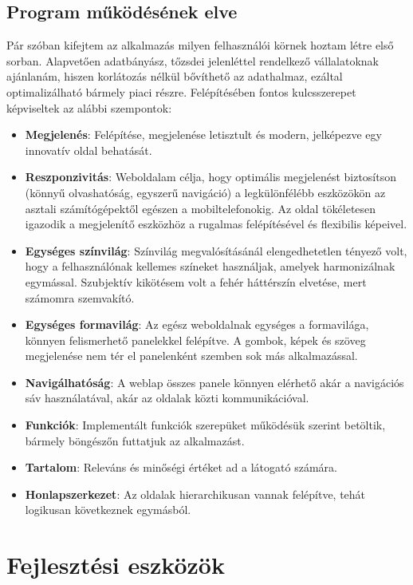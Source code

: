 \subsection{Program működésének elve}

Pár szóban kifejtem az alkalmazás milyen felhasználói körnek hoztam létre első sorban. Alapvetően adatbányász, tőzsdei jelenléttel rendelkező vállalatoknak ajánlanám, hiszen korlátozás nélkül bővíthető az adathalmaz, ezáltal optimalizálható bármely piaci részre. Felépítésében fontos kulcsszerepet képviseltek az alábbi szempontok:

\begin{itemize}
\item \textbf{Megjelenés}: Felépítése, megjelenése letisztult és modern, jelképezve egy innovatív oldal behatását.
\item \textbf{Reszponzivitás}: Weboldalam célja, hogy optimális megjelenést biztosítson \\
(könnyű olvashatóság, egyszerű navigáció) a legkülönfélébb eszközökön az asztali számítógépektől egészen a mobiltelefonokig. Az oldal tökéletesen igazodik a megjelenítő eszközhöz a rugalmas felépítésével és flexibilis képeivel.
\item \textbf{Egységes színvilág}: Színvilág megvalósításánál elengedhetetlen tényező volt, hogy a felhasználónak kellemes színeket használjak, amelyek harmonizálnak egymással. Szubjektív kikötésem volt a fehér háttérszín elvetése, mert számomra szemvakító.
\item \textbf{Egységes formavilág}: Az egész weboldalnak egységes a formavilága, könnyen felismerhető panelekkel felépítve. A gombok, képek és szöveg megjelenése nem tér el panelenként szemben sok más alkalmazással.
\item \textbf{Navigálhatóság}: A weblap összes panele könnyen elérhető akár a navigációs sáv használatával, akár az oldalak közti kommunikációval.
\item \textbf{Funkciók}: Implementált funkciók szerepüket működésük szerint betöltik, bármely böngészőn futtatjuk az alkalmazást.
\item \textbf{Tartalom}: Releváns és minőségi értéket ad a látogató számára.
\item \textbf{Honlapszerkezet}: Az oldalak hierarchikusan vannak felépítve, tehát logikusan következnek egymásból.
\end{itemize}

\section{Fejlesztési eszközök}

